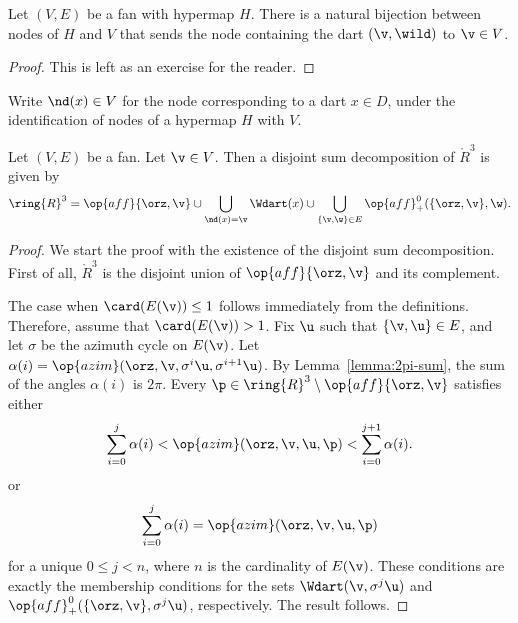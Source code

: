 
\begin{lemma}[]\label{lemma:node-vertex}
Let $(V,E)$ be a fan with hypermap $H$.  There is a natural bijection between
nodes of $H$ and $V$ that sends the node containing the dart $(\v,\wild)$
to $\v\in V$.
\end{lemma}

\begin{proof}  This is left as an exercise for the reader.
\end{proof}

\begin{definition}[$\nd$]
Write $\nd(x)\in V$ for the node corresponding to a dart $x\in D$,
under the identification of nodes of a hypermap $H$ with $V$.
\end{definition}

\begin{lemma}\label{lemma:disjoint}
  Let $(V,E)$ be a fan.  Let $\v\in V$.  Then  a disjoint sum
  decomposition of $\ring{R}^3$ is given by
\[ 
\ring{R}^3 = 
\op{aff}\{\orz,\v\} \cup
\bigcup_{\nd(x)=\v} \Wdart(x)  \cup 
\bigcup_{\{\v,\w\}\in E} \op{aff}_+^0(\{\orz,\v\},\w).
\] 
\end{lemma}
%
%
%





\begin{proof}
We start the proof with the existence of the disjoint sum decomposition.
First of all, $\ring{R}^3$ is the disjoint union of $\op{aff}\{\orz,\v\}$
and its complement.

The case when $\card(E(\v))\le 1$ follows immediately from the
definitions.  Therefore, assume that $\card(E(\v)) >1$.  Fix $\u$ such
that $\{\v,\u\}\in E$, and let $\sigma$ be the azimuth cycle on
$E(\v)$.  Let $\alpha(i)=\op{azim}(\orz,\v,\sigma^i
\u,\sigma^{i+1}\u)$.  By Lemma~\ref{lemma:2pi-sum}, the sum of the
angles $\alpha(i)$ is $2\pi$.  Every
$\p\in\ring{R}^3\setminus\op{aff}\{\orz,\v\}$ satisfies either
\[ 
\sum_{i=0}^j \alpha(i) <
\op{azim}(\orz,\v,\u,\p) < \sum_{i=0}^{j+1} \alpha(i).
\] 
or 
\[ 
\sum_{i=0}^j \alpha(i) = \op{azim}(\orz,\v,\u,\p)
\] 
for a unique $0 \le j < n$, where $n$ is the cardinality of $E(\v)$. 
These conditions are exactly the membership conditions for the sets
$
\Wdart(\v,\sigma^j \u)
$
and $\op{aff}_+^0(\{\orz,\v\},\sigma^j \u)$, respectively.
The result follows.
\end{proof}

